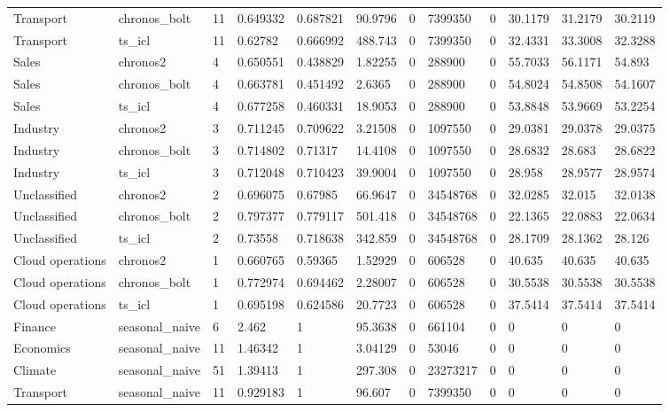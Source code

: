 \begin{tabular}{llllllllllll}
Transport & chronos\_bolt & 11 & 0.649332 & 0.687821 & 90.9796 & 0 & 7399350 & 0 & 30.1179 & 31.2179 & 30.2119 \\
Transport & ts\_icl & 11 & 0.62782 & 0.666992 & 488.743 & 0 & 7399350 & 0 & 32.4331 & 33.3008 & 32.3288 \\
Sales & chronos2 & 4 & 0.650551 & 0.438829 & 1.82255 & 0 & 288900 & 0 & 55.7033 & 56.1171 & 54.893 \\
Sales & chronos\_bolt & 4 & 0.663781 & 0.451492 & 2.6365 & 0 & 288900 & 0 & 54.8024 & 54.8508 & 54.1607 \\
Sales & ts\_icl & 4 & 0.677258 & 0.460331 & 18.9053 & 0 & 288900 & 0 & 53.8848 & 53.9669 & 53.2254 \\
Industry & chronos2 & 3 & 0.711245 & 0.709622 & 3.21508 & 0 & 1097550 & 0 & 29.0381 & 29.0378 & 29.0375 \\
Industry & chronos\_bolt & 3 & 0.714802 & 0.71317 & 14.4108 & 0 & 1097550 & 0 & 28.6832 & 28.683 & 28.6822 \\
Industry & ts\_icl & 3 & 0.712048 & 0.710423 & 39.9004 & 0 & 1097550 & 0 & 28.958 & 28.9577 & 28.9574 \\
Unclassified & chronos2 & 2 & 0.696075 & 0.67985 & 66.9647 & 0 & 34548768 & 0 & 32.0285 & 32.015 & 32.0138 \\
Unclassified & chronos\_bolt & 2 & 0.797377 & 0.779117 & 501.418 & 0 & 34548768 & 0 & 22.1365 & 22.0883 & 22.0634 \\
Unclassified & ts\_icl & 2 & 0.73558 & 0.718638 & 342.859 & 0 & 34548768 & 0 & 28.1709 & 28.1362 & 28.126 \\
Cloud operations & chronos2 & 1 & 0.660765 & 0.59365 & 1.52929 & 0 & 606528 & 0 & 40.635 & 40.635 & 40.635 \\
Cloud operations & chronos\_bolt & 1 & 0.772974 & 0.694462 & 2.28007 & 0 & 606528 & 0 & 30.5538 & 30.5538 & 30.5538 \\
Cloud operations & ts\_icl & 1 & 0.695198 & 0.624586 & 20.7723 & 0 & 606528 & 0 & 37.5414 & 37.5414 & 37.5414 \\
Finance & seasonal\_naive & 6 & 2.462 & 1 & 95.3638 & 0 & 661104 & 0 & 0 & 0 & 0 \\
Economics & seasonal\_naive & 11 & 1.46342 & 1 & 3.04129 & 0 & 53046 & 0 & 0 & 0 & 0 \\
Climate & seasonal\_naive & 51 & 1.39413 & 1 & 297.308 & 0 & 23273217 & 0 & 0 & 0 & 0 \\
Transport & seasonal\_naive & 11 & 0.929183 & 1 & 96.607 & 0 & 7399350 & 0 & 0 & 0 & 0 \\

\end{tabular}
